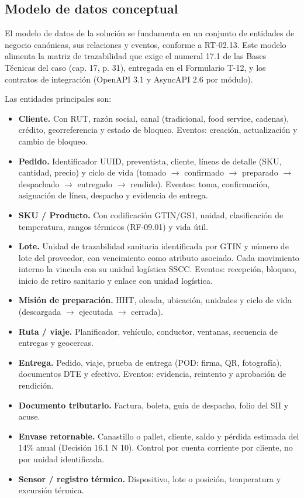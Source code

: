 \subsection{Modelo de datos conceptual}
\label{fuente-06-modelo-de-datos-conceptual}

El modelo de datos de la solución se fundamenta en un conjunto de entidades de negocio canónicas, sus relaciones y eventos, conforme a RT-02.13. Este modelo alimenta la matriz de trazabilidad que exige el numeral 17.1 de las Bases Técnicas del caso (cap. 17, p. 31), entregada en el Formulario T-12, y los contratos de integración (OpenAPI 3.1 y AsyncAPI 2.6 por módulo).

Las entidades principales son:

\begin{itemize}
  \item \textbf{Cliente.} Con RUT, razón social, canal (tradicional, food service, cadenas), crédito, georreferencia y estado de bloqueo. Eventos: creación, actualización y cambio de bloqueo.
  \item \textbf{Pedido.} Identificador UUID, preventista, cliente, líneas de detalle (SKU, cantidad, precio) y ciclo de vida (tomado $\rightarrow$ confirmado $\rightarrow$ preparado $\rightarrow$ despachado $\rightarrow$ entregado $\rightarrow$ rendido). Eventos: toma, confirmación, asignación de línea, despacho y evidencia de entrega.
  \item \textbf{SKU / Producto.} Con codificación GTIN/GS1, unidad, clasificación de temperatura, rangos térmicos (RF-09.01) y vida útil.
  \item \textbf{Lote.} Unidad de trazabilidad sanitaria identificada por GTIN y número de lote del proveedor, con vencimiento como atributo asociado. Cada movimiento interno la vincula con su unidad logística SSCC. Eventos: recepción, bloqueo, inicio de retiro sanitario y enlace con unidad logística.
  \item \textbf{Misión de preparación.} HHT, oleada, ubicación, unidades y ciclo de vida (descargada $\rightarrow$ ejecutada $\rightarrow$ cerrada).
  \item \textbf{Ruta / viaje.} Planificador, vehículo, conductor, ventanas, secuencia de entregas y geocercas.
  \item \textbf{Entrega.} Pedido, viaje, prueba de entrega (POD: firma, QR, fotografía), documentos DTE y efectivo. Eventos: evidencia, reintento y aprobación de rendición.
  \item \textbf{Documento tributario.} Factura, boleta, guía de despacho, folio del SII y acuse.
  \item \textbf{Envase retornable.} Canastillo o pallet, cliente, saldo y pérdida estimada del 14\% anual (Decisión 16.1 N\textdegree{} 10). Control por cuenta corriente por cliente, no por unidad identificada.
  \item \textbf{Sensor / registro térmico.} Dispositivo, lote o posición, temperatura y excursión térmica.
\end{itemize}

